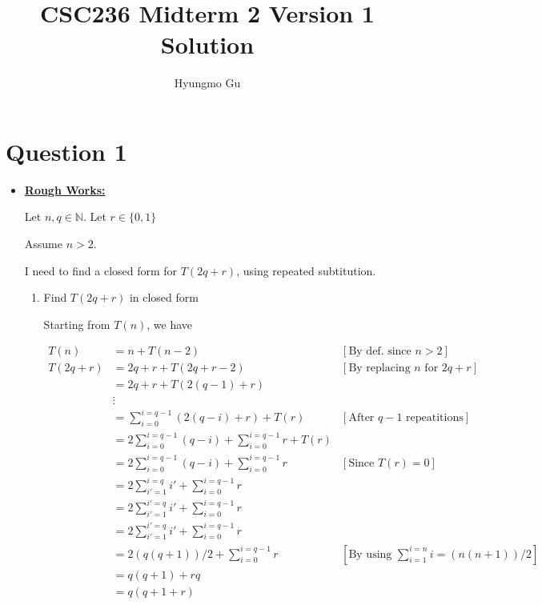 \documentclass[12pt]{article}
\begin{document}
\title{CSC236 Midterm 2 Version 1 Solution}
\author{Hyungmo Gu}
\maketitle

\section*{Question 1}
\begin{itemize}
    \item

    \begin{mdframed}
    \underline{\textbf{Rough Works:}}
    \bigskip

    Let $n, q \in \mathbb{N}$. Let $r \in \{0,1\}$

    \bigskip

    Assume $n > 2$.

    \bigskip

    I need to find a closed form for $T(2q + r)$, using repeated subtitution.

    \begin{enumerate}[1.]
        \item Find $T(2q + r)$ in closed form

        \begin{mdframed}
        Starting from $T(n)$, we have

        \begin{align}
            T(n) &= n + T(n-2) & [\text{By def. since $n > 2$}]\\
            T(2q+r) &= 2q+r + T(2q+r-2) & [\text{By replacing $n$ for $2q + r$}]\\
            &= 2q+r + T(2(q-1)+r)\\
            &\vdots\\
            &= \sum\limits_{i=0}^{i=q-1} (2(q-i) + r) + T(r) & [\text{After $q-1$ repeatitions}]\\
            &= 2\sum\limits_{i=0}^{i=q-1} (q-i) + \sum\limits_{i=0}^{i=q-1} r + T(r)\\
            &= 2\sum\limits_{i=0}^{i=q-1} (q-i) + \sum\limits_{i=0}^{i=q-1} r & [\text{Since $T(r) = 0$}]\\
            &= 2\sum\limits_{i'=1}^{i=q} i' + \sum\limits_{i=0}^{i=q-1} r\\
            &= 2\sum\limits_{i'=1}^{i'=q} i' + \sum\limits_{i=0}^{i=q-1} r\\
            &= 2\sum\limits_{i'=1}^{i'=q} i' + \sum\limits_{i=0}^{i=q-1} r\\
            &= 2(q(q+1))/2 + \sum\limits_{i=0}^{i=q-1} r &[\text{By using $\sum\limits_{i=1}^{i=n} i =(n(n+1))/2$}]\\
            &= q(q+1) + rq\\
            &= q(q+1+r)
        \end{align}
        \end{mdframed}
    \end{enumerate}

    \end{mdframed}
\end{itemize}
\end{document}
